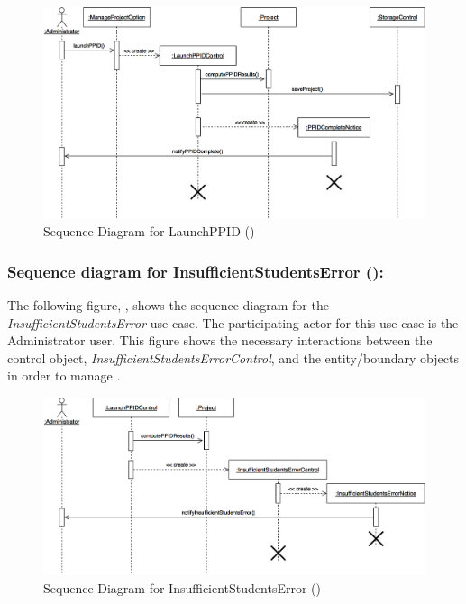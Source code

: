\documentclass[12pt,letterpaper]{article}
\begin{document}
\begin{figure}[H]
	\centering{}
	\includegraphics[scale=0.25]{imgs/seq/launch-ppid.png}
	\caption[ - Sequence Diagram for LaunchPPID]{Sequence Diagram for LaunchPPID ()}
\end{figure}

\subsubsection*{Sequence diagram for InsufficientStudentsError ():}

The following figure, , shows the sequence diagram for the {\it InsufficientStudentsError} use case. The participating actor for this use case is
the Administrator user. This figure shows the necessary interactions between the control object, {\it InsufficientStudentsErrorControl}, and the
entity/boundary objects in order to manage .

\begin{figure}[H]
	\centering{}
	\includegraphics[scale=0.27]{imgs/seq/insufficient-students-error.png}
	\caption[ - Sequence Diagram for InsufficientStudentsError]{Sequence Diagram for InsufficientStudentsError ()}
\end{figure}
\end{document}
